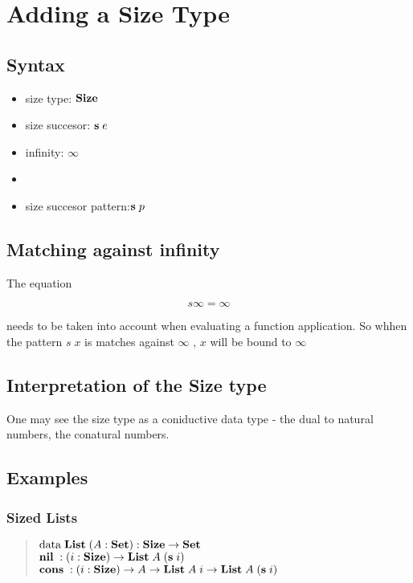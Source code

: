 \chapter{Adding a Size Type}

\section{Syntax}

\begin{itemize}
\item
size type: $ \mathbf{Size} $ 
\item
size succesor: $\mathbf{s}\; e $ 
\item
infinity: $\infty$ 
\item
\end{itemize}

\begin{itemize}
\item
size succesor pattern:$ \mathbf{s}\; p $ 
\end{itemize}

\section{Matching against infinity}
The equation 

\[ s \infty = \infty \]

needs to be taken into account when evaluating a function application.
So whhen the pattern $ s \; x $ is matches against $ \infty $ , $x$ will be bound to $ \infty $  

\section{Interpretation of the Size type}
One may see the size type as a coniductive data type - the dual to natural numbers, the conatural numbers.


\section{Examples}
\subsection{Sized Lists}
\begin{quote}
$\mathrm{data}\; \mathbf{List}\; ( A : \mathbf{Set} ) : \mathbf{Size} \rightarrow \mathbf{Set} $ 
\\
$\mathbf{nil}\; : ( i : \mathbf{Size} ) \rightarrow  \mathbf{List}\; A \; (\mathbf{s}\; i) $
\\
$\mathbf{cons}\; : ( i : \mathbf{Size} ) \rightarrow  A \rightarrow \mathbf{List}\; A \; i \rightarrow \mathbf{List}\; A \; (\mathbf{s}\; i) $
\end{quote}

